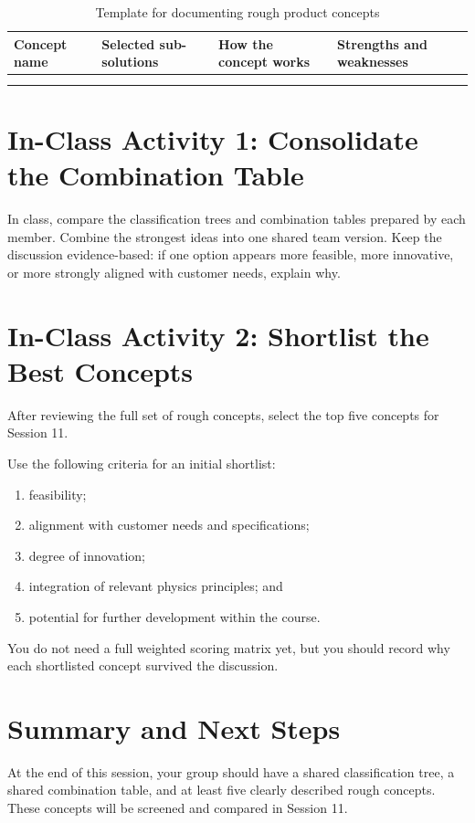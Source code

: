 \begin{table}[htbp]
\centering
\caption{Template for documenting rough product concepts}
\label{tab:session10-concept-template}
\renewcommand{\arraystretch}{1.2}
\begin{tabularx}{\textwidth}{|>{\raggedright\arraybackslash}p{}|>{\raggedright\arraybackslash}p{}|X|>{\raggedright\arraybackslash}p{}|}
\hline
\textbf{Concept name} & \textbf{Selected sub-solutions} & \textbf{How the concept works} & \textbf{Strengths and weaknesses} \\
\hline
 &  &  &  \\
\hline
 &  &  &  \\
\hline
\end{tabularx}
\end{table}

\section{In-Class Activity 1: Consolidate the Combination Table}

In class, compare the classification trees and combination tables prepared by each member. Combine the strongest ideas into one shared team version. Keep the discussion evidence-based: if one option appears more feasible, more innovative, or more strongly aligned with customer needs, explain why.

\section{In-Class Activity 2: Shortlist the Best Concepts}

After reviewing the full set of rough concepts, select the top five concepts for Session 11.

Use the following criteria for an initial shortlist:
\begin{enumerate}
    \item feasibility;
    \item alignment with customer needs and specifications;
    \item degree of innovation;
    \item integration of relevant physics principles; and
    \item potential for further development within the course.
\end{enumerate}

You do not need a full weighted scoring matrix yet, but you should record why each shortlisted concept survived the discussion.

\section{Summary and Next Steps}

At the end of this session, your group should have a shared classification tree, a shared combination table, and at least five clearly described rough concepts. These concepts will be screened and compared in Session 11.
